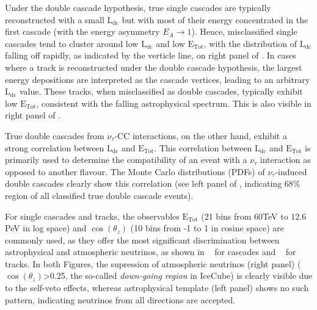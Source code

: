 Under the double cascade hypothesis, true single cascades are typically reconstructed with a small $\mathrm{L}_{\mathrm{dc}}$ but with most of their energy concentrated in the first cascade (with the energy asymmetry $E_A \rightarrow 1$). Hence, misclassified single cascades tend to cluster around low $\mathrm{L}_{\mathrm{dc}}$ and low $\mathrm{E}_{\mathrm{Tot}}$, with the distribution of $\mathrm{L}_{\mathrm{dc}}$ falling off rapidly, as indicated by the verticle line, on right panel of . In cases where a track is reconstructed under the double cascade hypothesis, the largest energy depositions are interpreted as the cascade vertices, leading to an arbitrary $\mathrm{L}_{\mathrm{dc}}$ value. These tracks, when misclassified as double cascades, typically exhibit low $\mathrm{E}_{\mathrm{Tot}}$, consistent with the falling astrophysical spectrum. This is also visible in right panel of .

True double cascades from $\nu_\tau$-CC interactions, on the other hand, exhibit a strong correlation between $\mathrm{L}_{\mathrm{dc}}$ and $\mathrm{E}_{\mathrm{Tot}}$. This correlation between $\mathrm{L}_{\mathrm{dc}}$ and $\mathrm{E}_{\mathrm{Tot}}$ is primarily used to determine the compatibility of an event with a $\nu_\tau$ interaction as opposed to another flavour. The Monte Carlo distributions (PDFs) of $\nu_\tau$-induced double cascades clearly show this correlation (see left panel of , indicating 68\% region of all classified true double cascade events). 

For single cascades and tracks, the observables $\mathrm{E}_{\mathrm{Tot}}$ (21 bins from 60TeV to 12.6 PeV in log space) and $\cos(\theta_z)$ (10 bins from -1 to 1 in cosine space) are commonly used, as they offer the most significant discrimination between astrophysical and atmospheric neutrinos, as shown in ~ for cascades and ~ for tracks. In both Figures, the supression of atmospheric neutrinos (right panel) ($\cos(\theta_z)$>0.25, the so-called \emph{down-going region} in IceCube) is clearly visible due to the self-veto effects, whereas astrophysical template (left panel) shows no such pattern, indicating neutrinos from all directions are accepted. 


